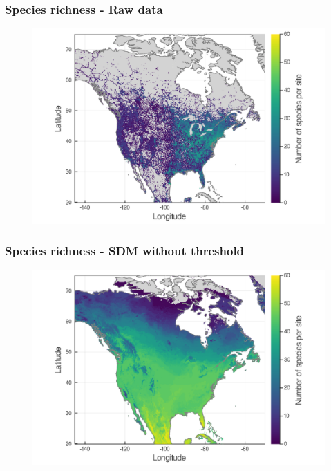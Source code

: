 \documentclass[10pt]{beamer}
\begin{document}
\begin{frame}
  \frametitle{Species richness - Raw data}
  \begin{figure}
    \centering
    \hspace*{-0cm}\includegraphics[scale=0.17]{fig/03_raw_richness.png}
  \end{figure}
\end{frame}

\begin{frame}
  \frametitle{Species richness - SDM without threshold}
  \begin{figure}
    \centering
    \hspace*{-0cm}\includegraphics[scale=0.17]{fig/03_sdm_richness.png}
  \end{figure}
\end{frame}
\end{document}
